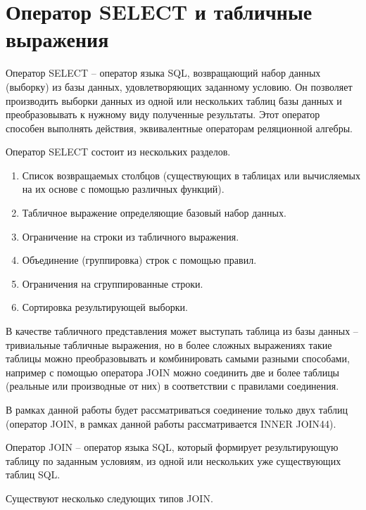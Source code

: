 \section{Оператор SELECT и табличные выражения}

Оператор SELECT -- оператор языка SQL, возвращающий набор данных (выборку) из базы данных, удовлетворяющих заданному условию. Он позволяет производить выборки данных из одной или нескольких таблиц базы данных и преобразовывать к нужному виду полученные результаты. Этот оператор способен выполнять действия, эквивалентные операторам реляционной алгебры. 

Оператор SELECT состоит из нескольких разделов.
\begin{enumerate}
	\item Список возвращаемых столбцов (существующих в таблицах или вычисляемых на их основе с помощью различных функций).
	\item Табличное выражение определяющие базовый набор данных.
	\item Ограничение на строки из табличного выражения.
	\item Объединение (группировка) строк с помощью правил.
	\item Ограничения на сгруппированные строки. 
	\item Сортировка результирующей выборки.
\end{enumerate}

В качестве табличного представления может выступать таблица из базы данных -- тривиальные табличные выражения, но в более сложных выражениях такие таблицы можно преобразовывать и комбинировать самыми разными способами, например с помощью оператора JOIN можно соединить две и более таблицы (реальные или производные от них) в соответствии с правилами соединения.


В рамках данной работы будет рассматриваться соединение только двух таблиц (оператор JOIN, в рамках данной работы рассматривается INNER JOIN44).

Оператор JOIN -- оператор языка SQL, который формирует результирующую таблицу по заданным условиям, из одной или нескольких уже существующих таблиц SQL. 

Существуют несколько следующих типов JOIN.

